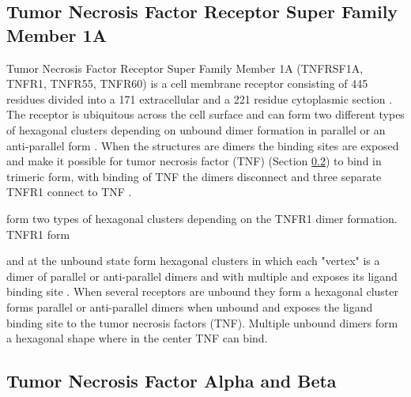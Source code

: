 \subsection{Tumor Necrosis Factor Receptor Super Family Member 1A}
Tumor Necrosis Factor Receptor Super Family Member 1A (TNFRSF1A, TNFR1, TNFR55, TNFR60) is a cell membrane receptor consisting of 445 residues divided into a 171 extracellular and a 221 residue cytoplasmic section \cite{}.
The receptor is ubiquitous across the cell surface and can form two different types of hexagonal clusters depending on unbound dimer formation in parallel or an anti-parallel form \cite{}.  
When the structures are dimers the binding sites are exposed and make it possible for tumor necrosis factor (TNF) (Section \ref{subsec:CD_TNF_A_B}) to bind in trimeric form, with binding of TNF the dimers disconnect and three separate TNFR1 connect to TNF \cite{}.

form two types of hexagonal clusters depending on the TNFR1 dimer formation. TNFR1 form


and at the unbound state form hexagonal clusters  in which each "vertex" is a dimer of parallel or anti-parallel dimers and with multiple and exposes its ligand binding site \cite{}. 
When several receptors are unbound they form a hexagonal cluster 
 forms parallel or anti-parallel dimers when unbound and exposes the ligand binding site to the tumor necrosis factors (TNF)\cite{}.
Multiple unbound dimers form a hexagonal shape where in the center TNF can bind.




%
%



\label{subsec:CD_TNFRSF1A}

\subsection{Tumor Necrosis Factor Alpha and Beta}


\label{subsec:CD_TNF_A_B}